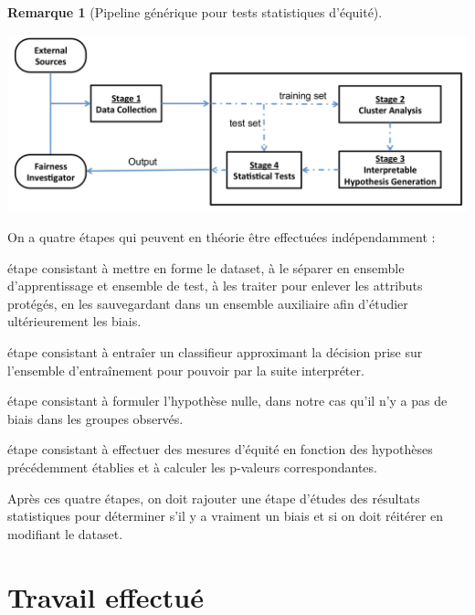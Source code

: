 \documentclass{article}
\theoremstyle{definition}
\newtheorem{myRem}{Remarque}
\begin{document}
\begin{myRem}[Pipeline générique pour tests statistiques d'équité] \hfill
  \begin{center}
    \includegraphics[width=\textwidth]{genericPipeline}
  \end{center}
  On a quatre étapes qui peuvent en théorie être effectuées indépendamment :
  \begin{description}[style=nextline]
  \item[1. Acquisition de donnée]
    étape consistant à mettre en forme le dataset, à le séparer en ensemble d'apprentissage et ensemble de test, à les traiter pour enlever les attributs protégés, en les sauvegardant dans un ensemble auxiliaire afin d'étudier ultérieurement les biais.

  \item[2. Partionnement de données et apprentissage]
    étape consistant à entraîer un classifieur approximant la décision prise sur l'ensemble d'entraînement pour pouvoir par la suite interpréter.

  \item[3. Génération d'hypothèse interprétable]
    étape consistant à formuler l'hypothèse nulle, dans notre cas qu'il n'y a pas de biais dans les groupes observés.

  \item[4. Tests statistiques]
    étape consistant à effectuer des mesures d'équité en fonction des hypothèses précédemment établies et à calculer les p-valeurs correspondantes.
  \end{description}

  Après ces quatre étapes, on doit rajouter une étape d'études des résultats statistiques pour déterminer s'il y a vraiment un biais et si on doit réitérer en modifiant le dataset.
\end{myRem}



\section{Travail effectué}
\end{document}
